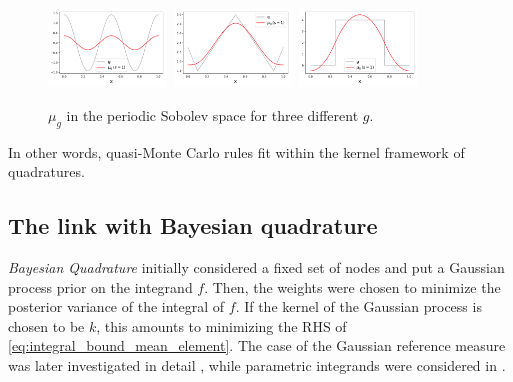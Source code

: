 \documentclass[twoside,11pt]{book}
\begin{document}
\begin{figure}[]
    \centering
\includegraphics[width= 0.28\textwidth]{img/mean_element/Sobolev/mean_element_cos_ko_1.pdf}~\includegraphics[width= 0.28\textwidth]{img/mean_element/Sobolev/mean_element_saw_ko_1.pdf}~\includegraphics[width= 0.28\textwidth]{img/mean_element/Sobolev/mean_element_step_ko_1.pdf}\\
\caption{$\mu_{g}$ in the periodic Sobolev space for three different $g$.
\label{fig:mean_element}}
\end{figure}


In other words, quasi-Monte Carlo rules fit within the kernel framework of quadratures. 









\subsection{The link with Bayesian quadrature}
\label{subsec:bayesian_quadrature}
\emph{Bayesian Quadrature} initially \citep{Lar72} considered a fixed set of nodes and put a Gaussian process prior on the integrand $f$. Then, the weights were chosen to minimize the posterior variance of the integral of $f$. If the kernel of the Gaussian process is chosen to be $k$, this amounts to minimizing the RHS of \eqref{eq:integral_bound_mean_element}. The case of the Gaussian reference measure was later investigated in detail \citep{Hag91}, while parametric integrands were considered in \citep{Min00}.
\end{document}
